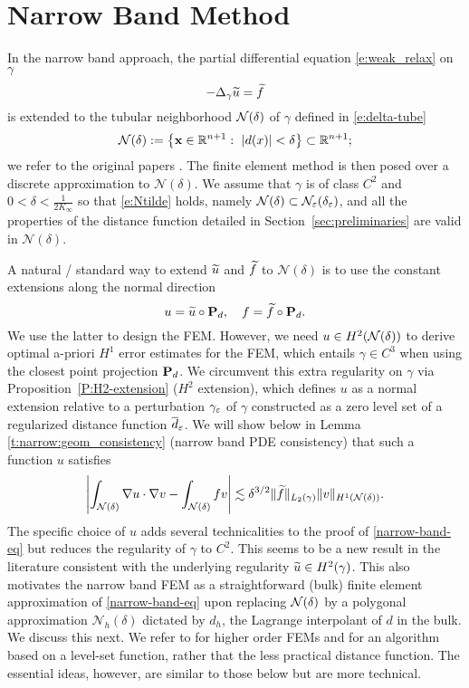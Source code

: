 \section{Narrow Band Method}\label{sec:narrow}

In the narrow band approach, the partial differential equation \eqref{e:weak_relax}
on $\gamma$
$$
-\Delta_\gamma \widetilde{u} = \widetilde{f}
$$
is extended to the tubular neighborhood ${\mathcal{N}(\delta)}$ of $\gamma$ defined in \eqref{e:delta-tube}
$$
\mathcal N(\delta):= \left \lbrace  {\bf x}  \in \mathbb R^{n+1}  : \   |d(x)| < \delta \right\rbrace \subset \mathbb R^{n+1};
$$
%
we refer to the original papers \cite{MR1868103,MR2485787}. The finite element method is then posed over a discrete approximation to $\mathcal{N}(\delta)$.
%
We assume that $\gamma$ is of class $C^2$ and $0<\delta < \frac 1{2 K_\infty}$ so that \eqref{e:Ntilde} holds, namely ${\mathcal{N}(\delta)}\subset{\mathcal{N}}_{\varepsilon}(\delta_{\varepsilon})$, and all the properties of the distance function detailed in Section~\ref{sec:preliminaries} are valid in $\mathcal N(\delta)$.

A natural / standard way to extend $\widetilde{u}$ and $\widetilde{f}$ to $\mathcal N(\delta)$ is to use the constant extensions along the normal direction
%
\[
u = \widetilde{u} \circ {\bf P}_d,
\quad
f = \widetilde{f} \circ {\bf P}_d.
\]
%
We use the latter to design the FEM. However, we need $u \in H^2({\mathcal{N}(\delta)})$ to derive optimal a-priori $H^1$ error estimates for the FEM, which entails $\gamma \in  C^3$ when using the closest point projection ${\bf P}_d$. We circumvent this extra regularity on $\gamma$ via Proposition~\ref{P:H2-extension} ($H^2$ extension), which defines $u$ as a normal extension relative to a perturbation ${\gamma_\varepsilon}$ of $\gamma$ constructed as a zero level set of a regularized distance function $\overline{d}_\varepsilon$. We will show below in Lemma \ref{t:narrow:geom_consistency} (narrow band PDE consistency) that such a function $u$ satisfies
%
\begin{equation}\label{narrow-band-eq}
\left| \int_{\mathcal N(\delta)} \nabla u \cdot \nabla v - \int_{\mathcal N(\delta)} f v \right| \lesssim  \delta^{3/2} \| \widetilde{f} \|_{L_2(\gamma)} \|  v \|_{H^1(\mathcal N(\delta))}. 
\end{equation}
%
The specific choice of $u$ adds several technicalities to the proof of \eqref{narrow-band-eq} but reduces the regularity of $\gamma$ to $C^2$. This seems to be a new result in the literature consistent with the underlying regularity $\widetilde{u}\in H^2(\gamma)$. This also motivates the narrow band FEM as a straightforward (bulk) finite element approximation of \eqref{narrow-band-eq} upon replacing ${\mathcal{N}(\delta)}$ by a polygonal approximation $\mathcal N_h(\delta)$ dictated by $d_h$, the Lagrange interpolant of $d$ in the bulk. We discuss this next.
We refer to \cite{MR3471100} for higher order FEMs and \cite{MR2608464,MR3249369} for an algorithm based on a level-set function, rather that the less practical distance function. The essential ideas, however, are similar to those below but are more technical.


